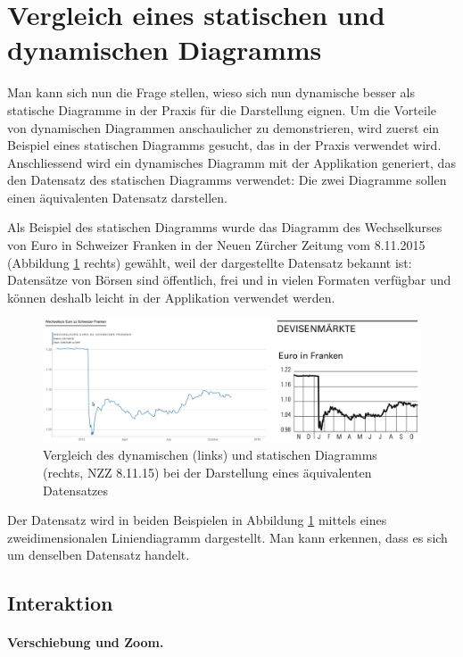 \section{Vergleich eines statischen und dynamischen Diagramms}

Man kann sich nun die Frage stellen, wieso sich nun dynamische besser als statische Diagramme in der Praxis für die Darstellung eignen. Um die Vorteile von dynamischen Diagrammen anschaulicher zu demonstrieren, wird zuerst ein Beispiel eines statischen Diagramms gesucht, das in der Praxis verwendet wird. Anschliessend wird ein dynamisches Diagramm mit der Applikation generiert, das den Datensatz des statischen Diagramms verwendet: Die zwei Diagramme sollen einen äquivalenten Datensatz darstellen.

Als Beispiel des statischen Diagramms wurde das Diagramm des Wechselkurses von Euro in Schweizer Franken in der Neuen Zürcher Zeitung vom 8.11.2015 (Abbildung \ref{fig:finance} rechts) gewählt, weil der dargestellte Datensatz bekannt ist: Datensätze von Börsen sind öffentlich, frei und in vielen Formaten verfügbar und können deshalb leicht in der Applikation verwendet werden.

\begin{figure}[H]
	\centering
	\includegraphics[width=\linewidth]{images/finance}
	\caption[Vergleich des dynamischen und statischen Diagramms]{Vergleich des dynamischen (links) und statischen Diagramms (rechts, NZZ 8.11.15) bei der Darstellung eines äquivalenten Datensatzes}
	\label{fig:finance}
\end{figure}

Der Datensatz wird in beiden Beispielen in Abbildung \ref{fig:finance} mittels eines zweidimensionalen Liniendiagramm dargestellt. Man kann erkennen, dass es sich um denselben Datensatz handelt.

\subsection{Interaktion}

\paragraph{Verschiebung und Zoom.}

